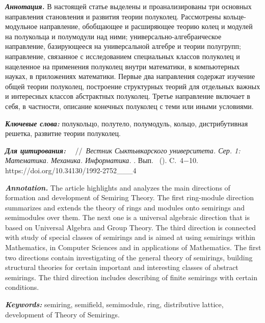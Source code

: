 \documentclass[a4paper,12pt]{book}
\begin{document}
	\begin{paper}
		\vskip5mm
		\begin{annot}
			\textbf{\itshape Аннотация.}
			В настоящей статье выделены и проанализированы три основных направления становления и развития теории полуколец. Рассмотрены кольце-модульное направление, обобщающее и расширяющее теорию колец и модулей на полукольца и полумодули над ними; универсально-алгебраическое направление, базирующееся на универсальной алгебре и теории полугрупп; направление, связанное с исследованием специальных классов полуколец и нацеленное на применения полуколец внутри математики, в компьютерных науках, в приложениях математики. Первые два направления содержат изучение общей теории полуколец, построение структурных теорий для отдельных важных и интересных классов абстрактных полуколец. Третье направление включает в себя, в частности,  описание конечных полуколец с теми или иными условиями.
			
			\textbf{\itshape Ключевые слова: } полукольцо, полутело, полумодуль, кольцо, дистрибутивная решетка, развитие теории полуколец.
		\end{annot}
		
		\textbf{\itshape Для цитирования: } \theruscontauth~\thecitationtitle~//~\textit{Вестник Сыктывкарского университета. Сер. 1: Математика. Механика. Информатика.} \theyear. Вып. \thenumb~(\thesubnumb). C.~4$-$10. https://doi.org/10.34130/1992-2752\_\theyear\_\thenumb\_4
		
		\newpage
		\summary
		
		\begin{annot}
			\textbf{\itshape Annotation.}
			The article highlights and analyzes the main directions of formation and development of Semiring Theory. The first ring-module direction summarizes and extends the theory of rings and modules onto semirings and semimodules over them. The next one is a universal algebraic direction that is based on Universal Algebra and Group Theory. The third direction is connected with study of special classes of semirings and is aimed at using semirings within Mathematics, in Computer Sciences and in applications of Mathematics. The first two directions contain investigating of the general theory of semirings, building structural theories for certain important and interesting classes of abstract semirings. The third direction includes describing of finite semirings with certain conditions.
			
			\textbf{\itshape Keywords: } semiring, semifield, semimodule, ring, distributive lattice, development of Theory of Semirings.
		\end{annot}
		

\end{paper}
\end{document}
